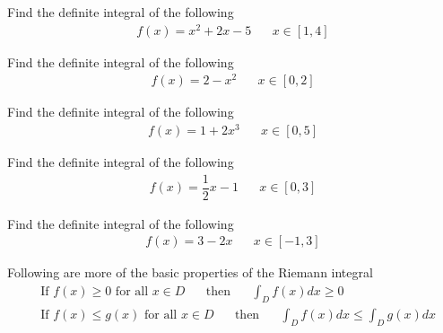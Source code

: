 \begin{exercise}
Find the definite integral of the following
\begin{align*}
    f(x) = x^{2} + 2x - 5 \hspace{20pt} x \in [1, 4]
\end{align*}
\end{exercise}

\begin{exercise}
Find the definite integral of the following
\begin{align*}
    f(x) = 2 - x^{2} \hspace{20pt} x \in [0, 2]
\end{align*}
\end{exercise}

\begin{exercise}
Find the definite integral of the following
\begin{align*}
    f(x) = 1 + 2x^{3} \hspace{20pt} x \in [0, 5]
\end{align*}
\end{exercise}

\begin{exercise}
Find the definite integral of the following
\begin{align*}
    f(x) = \dfrac{1}{2}x - 1 \hspace{20pt} x \in [0, 3]
\end{align*}
\end{exercise}

\begin{exercise}
Find the definite integral of the following
\begin{align*}
    f(x) = 3 - 2x \hspace{20pt} x \in [-1, 3]
\end{align*}
\end{exercise}

\begin{theorem}
Following are more of the basic properties of the Riemann integral
\begin{align*}
    &\text{If} \hspace{4pt} f(x) \geq 0 \hspace{4pt} \text{for all $x \in D$} \hspace{20pt} \text{then} \hspace{20pt} \int_{D} f(x) dx \geq 0\\[2ex]
    &\text{If} \hspace{4pt} f(x) \leq g(x) \hspace{4pt} \text{for all $x \in D$} \hspace{20pt} \text{then} \hspace{20pt} \int_{D} f(x) dx \leq \int_{D} g(x) dx 
\end{align*}
\end{theorem}

